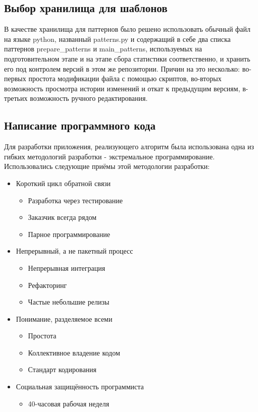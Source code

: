 \subsection{Выбор хранилища для шаблонов}
В качестве хранилища для паттернов было решено использовать обычный файл на
языке python, названный patterns.py и содержащий в себе два списка паттернов
prepare\_patterns и main\_patterns, используемых на подготовительном этапе
и на этапе сбора статистики соответственно,
и хранить его под контролем версий в этом же репозитории. Причин
на это несколько: во-первых простота модификации файла с помощью скриптов,
во-вторых возможность просмотра истории изменений и откат к предыдущим версиям,
в-третьих возможность ручного редактирования.

\subsection{Написание программного кода}

Для разработки приложения, реализующего алгоритм была использована одна из
гибких методологий разработки - экстремальное программирование.\\

Использовались следующие приёмы этой методологии разработки:

\begin{itemize}
  \item Короткий цикл обратной связи
    \begin{itemize}
      \item Разработка через тестирование
      \item Заказчик всегда рядом
      \item Парное программирование
    \end{itemize}
  \item Непрерывный, а не пакетный процесс
    \begin{itemize}
      \item Непрерывная интеграция
      \item Рефакторинг
      \item Частые небольшие релизы
    \end{itemize}
  \item Понимание, разделяемое всеми
    \begin{itemize}
      \item Простота
      \item Коллективное владение кодом
      \item Стандарт кодирования
    \end{itemize}
    \item Социальная защищённость программиста
      \begin{itemize}
        \item 40-часовая рабочая неделя
      \end{itemize}
\end{itemize}


